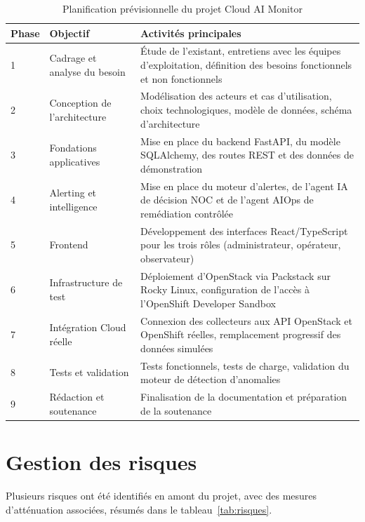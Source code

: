 \documentclass[11pt,a4paper]{report}
\begin{document}
\begin{table}[H]
\centering
\renewcommand{\arraystretch}{1.4}
\begin{tabular}{|p{1.6cm}|p{4.2cm}|p{7.5cm}|}
\hline
\textbf{Phase} & \textbf{Objectif} & \textbf{Activités principales} \\
\hline
1 & Cadrage et analyse du besoin & Étude de l'existant, entretiens avec les
équipes d'exploitation, définition des besoins fonctionnels et non
fonctionnels \\
\hline
2 & Conception de l'architecture & Modélisation des acteurs et cas
d'utilisation, choix technologiques, modèle de données, schéma d'architecture \\
\hline
3 & Fondations applicatives & Mise en place du backend FastAPI, du modèle
SQLAlchemy, des routes REST et des données de démonstration \\
\hline
4 & Alerting et intelligence & Mise en place du moteur d'alertes, de l'agent
IA de décision NOC et de l'agent AIOps de remédiation contrôlée \\
\hline
5 & Frontend & Développement des interfaces React/TypeScript pour les trois
rôles (administrateur, opérateur, observateur) \\
\hline
6 & Infrastructure de test & Déploiement d'OpenStack via Packstack sur Rocky
Linux, configuration de l'accès à l'OpenShift Developer Sandbox \\
\hline
7 & Intégration Cloud réelle & Connexion des collecteurs aux API OpenStack et
OpenShift réelles, remplacement progressif des données simulées \\
\hline
8 & Tests et validation & Tests fonctionnels, tests de charge, validation du
moteur de détection d'anomalies \\
\hline
9 & Rédaction et soutenance & Finalisation de la documentation et préparation
de la soutenance \\
\hline
\end{tabular}
\caption{Planification prévisionnelle du projet Cloud AI Monitor}
\label{tab:planning}
\end{table}

\section{Gestion des risques}

Plusieurs risques ont été identifiés en amont du projet, avec des mesures
d'atténuation associées, résumés dans le tableau~\ref{tab:risques}.
\end{document}
